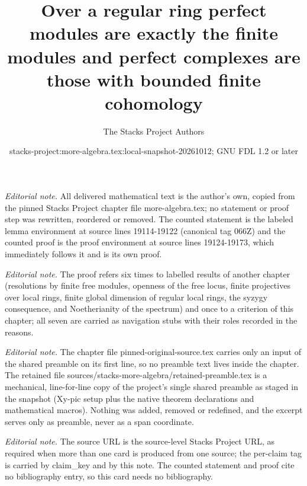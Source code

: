 \documentclass[10pt,a4paper]{amsart}
\title{Over a regular ring perfect modules are exactly the finite modules and perfect complexes are those with bounded finite cohomology}
\author{The Stacks Project Authors}
\date{stacks-project:more-algebra.tex:local-snapshot-20261012; GNU FDL 1.2 or later}
\theoremstyle{plain}
\theoremstyle{definition}
\theoremstyle{remark}
\numberwithin{equation}{subsection}
\begin{document}
\maketitle
\setcounter{subsection}{1}
\noindent\textit{Editorial note.} All delivered mathematical text is the author's own, copied from the pinned Stacks Project chapter file more-algebra.tex; no statement or proof step was rewritten, reordered or removed. The counted statement is the labeled lemma environment at source lines 19114-19122 (canonical tag 066Z) and the counted proof is the proof environment at source lines 19124-19173, which immediately follows it and is its own proof.\par\medskip
\noindent\textit{Editorial note.} The proof refers six times to labelled results of another chapter (resolutions by finite free modules, openness of the free locus, finite projectives over local rings, finite global dimension of regular local rings, the syzygy consequence, and Noetherianity of the spectrum) and once to a criterion of this chapter; all seven are carried as navigation stubs with their roles recorded in the reasons.\par\medskip
\noindent\textit{Editorial note.} The chapter file pinned-original-source.tex carries only an input of the shared preamble on its first line, so no preamble text lives inside the chapter. The retained file sources/stacks-more-algebra/retained-preamble.tex is a mechanical, line-for-line copy of the project's single shared preamble as staged in the snapshot (Xy-pic setup plus the native theorem declarations and mathematical macros). Nothing was added, removed or redefined, and the excerpt serves only as preamble, never as a span coordinate.\par\medskip
\noindent\textit{Editorial note.} The source URL is the source-level Stacks Project URL, as required when more than one card is produced from one source; the per-claim tag is carried by claim\_key and by this note. The counted statement and proof cite no bibliography entry, so this card needs no bibliography.\par\medskip
\end{document}
